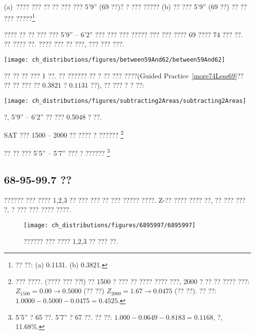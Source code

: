 \begin{exercise}\label{more74Less69}
(a)~???? ??? ?? ?? ??? ??? 5'9'' (69 ??)? ? ??? ????? (b) ?? ??? 5'9'' (69 ??) ?? ?? ??? ?????\footnote{?? ??: (a) 0.1131. (b) 0.3821.}
\end{exercise}

\begin{example}{???? ?? ?? ??? ??? 5'9'' -- 6'2'' ??? ??? ??? ?????}
??? ??? ???? 69 ???? 74 ??? ??. ?? ???? ??. ???? ??? ?? ???, ??? ??? ???.\textC{\vspace{-2mm}}
\begin{center}
\texttt{[image: ch\_distributions/figures/between59And62/between59And62]}\textC{\vspace{-2mm}}
\end{center}
?? ?? ?? ??? 1 ??. ?? ?????? ?? ? ?? ??? ????(Guided Practice~\ref{more74Less69}?? ?? ?? ??? ?? $0.3821$ ? $0.1131$ ??), ?? ??? ? ? ??: \textC{\vspace{-2mm}}
\begin{center}
\texttt{[image: ch\_distributions/figures/subtracting2Areas/subtracting2Areas]}\textC{\vspace{-2mm}}
\end{center}
?, 5'9'' -- 6'2'' ?? ??? 0.5048 ? ??.
\end{example}

\begin{exercise}
SAT ??? 1500 -- 2000 ?? ???? ? ?????? \footnote{??? ????. (???? ??? ??!) 
?? 1500 ? ??? ?? ???? ???? ???, 2000 ? ?? ?? ???? ???: $Z_{1500} = 0.00 \to 0.5000$ (?? ??) $Z_{2000} = 1.67 \to 0.0475$ (?? ??). ?? ??: $1.0000-0.5000 - 0.0475 = 0.4525$.}
\end{exercise}

\begin{exercise}
?? ?? ??? 5'5'' -- 5'7'' ??? ? ?????? \footnote{5'5'' ? 65 ??. 5'7'' ? 67 ??. ?? ??: $1.000 - 0.0649 - 0.8183 = 0.1168$, ?, 11.68\%.}
\end{exercise}



\subsection{68-95-99.7 ??}
?????? ??? ???? 1,2,3 ?? ??? ??? ?? ??? ????? ????. Z-?? ???? ???? ??, ?? ??? ??? ?, ? ??? ??? ???? ????.

\begin{figure}[hht]
\centering
\texttt{[image: ch\_distributions/figures/6895997/6895997]}
\caption{?????? ??? ???? 1,2,3 ?? ??? ??.}
\label{6895997}
\end{figure}

